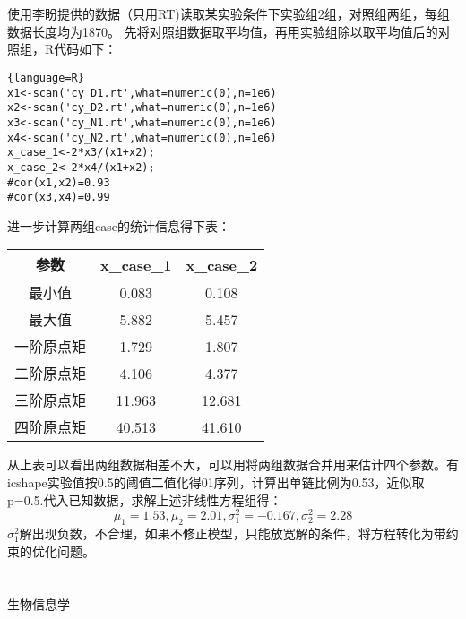 \documentclass[12pt]{article}
\begin{document}
\section{\textbf{}}
使用李盼提供的数据（只用RT)读取某实验条件下实验组2组，对照组两组，每组数据长度均为1870。
先将对照组数据取平均值，再用实验组除以取平均值后的对照组，R代码如下：
\begin{lstlisting}{language=R}
x1<-scan('cy_D1.rt',what=numeric(0),n=1e6)
x2<-scan('cy_D2.rt',what=numeric(0),n=1e6)
x3<-scan('cy_N1.rt',what=numeric(0),n=1e6)
x4<-scan('cy_N2.rt',what=numeric(0),n=1e6)
x_case_1<-2*x3/(x1+x2);
x_case_2<-2*x4/(x1+x2);
#cor(x1,x2)=0.93
#cor(x3,x4)=0.99
\end{lstlisting}
进一步计算两组case的统计信息得下表：
\begin{table}[!ht]
\begin{tabular}{ccc}
\hline
参数 & x\_case\_1 & x\_case\_2 \\
\hline
最小值 & 0.083 & 0.108 \\
最大值 & 5.882 & 5.457 \\
一阶原点矩 &1.729 & 1.807 \\
二阶原点矩 &4.106 & 4.377\\
三阶原点矩 &11.963 &12.681\\
四阶原点矩 &40.513 &41.610\\
\hline
\end{tabular}
\end{table}
从上表可以看出两组数据相差不大，可以用将两组数据合并用来估计四个参数。有icshape实验值按0.5的阈值二值化得01序列，计算出单链比例为0.53，近似取p=0.5.代入已知数据，求解上述非线性方程组得：
\[\mu_1=1.53,\mu_2=2.01,\sigma_1^2=-0.167,\sigma_2^2=2.28\]
$\sigma_1^2$解出现负数，不合理，如果不修正模型，只能放宽解的条件，将方程转化为带约束的优化问题。
\section{\textbf{}}
\section{\textbf{}}
\begin{thebibliography}{}
 生物信息学
 
\end{thebibliography}
\end{document}
